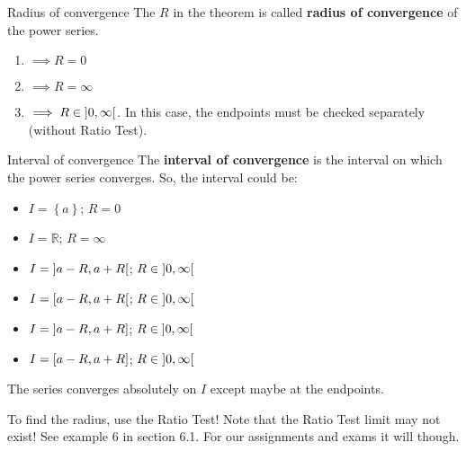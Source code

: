 \begin{Definition}{Radius of convergence}{}
    The $ R $ in the theorem is called \textbf{radius of convergence}
    of the power series.
    \begin{enumerate}
        \item $ \implies R=0 $
        \item $ \implies R=\infty $
        \item $ \implies R\in\interval[open]{0}{\infty} $. In this case,
              the endpoints must be checked separately (without Ratio Test).
    \end{enumerate}
\end{Definition}

\begin{Definition}{Interval of convergence}{}
    The \textbf{interval of convergence} is the interval on which the power
    series converges. So, the interval could be:
    \begin{itemize}
        \item $ I=\left\{ a\right\} $;
              $ R=0 $
        \item $ I=\mathbb{R} $;
              $ R=\infty $
        \item $ I=\interval[open]{a-R}{a+R} $;
              $ R\in\interval[open]{0}{\infty} $
        \item $ I=\interval[open right]{a-R}{a+R} $;
              $ R\in\interval[open]{0}{\infty} $
        \item $ I=\interval[open left]{a-R}{a+R} $;
              $ R\in\interval[open]{0}{\infty} $
        \item $ I=\interval{a-R}{a+R} $;
              $ R\in\interval[open]{0}{\infty} $
    \end{itemize}
\end{Definition}

\begin{Remark}{}{}
    The series converges absolutely on $ I $ except maybe at the endpoints.
\end{Remark}
To find the radius, use the Ratio Test! Note that the Ratio Test limit
may not exist! See example 6 in section 6.1. For our assignments and exams it will though.

